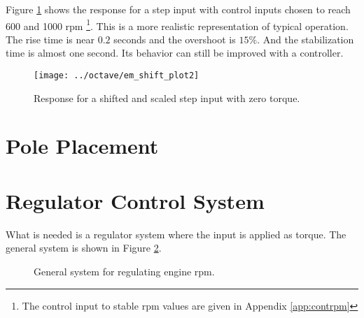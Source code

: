 \documentclass{article}
\begin{document}
Figure \ref{fig:em_shift_plot2} shows the response for a step input
with control inputs chosen to reach 600 and 1000 rpm
\footnote{The control input to stable rpm values are given in
Appendix \ref{app:contrpm}}.
This is a more realistic representation of typical operation.
The rise time is near $0.2$ seconds and the overshoot is $15\%$.
And the stabilization time is almost one second.
Its behavior can still be improved with a controller.

\begin{figure}[htbp!]
\begin{center}
\texttt{[image: ../octave/em\_shift\_plot2]}
\end{center}
\caption{Response for a shifted and scaled step input with zero torque.}
\label{fig:em_shift_plot2}
\end{figure}


\clearpage

\section{Pole Placement}


\clearpage
\section{Regulator Control System}

What is needed is a regulator system where the input is applied
as torque.
The general system is shown in Figure \ref{fig:rpm1}.

\begin{figure}[hbp!]
\begin{center}


\end{center}
\caption{General system for regulating engine rpm.}\label{fig:rpm1}
\end{figure}
\end{document}

